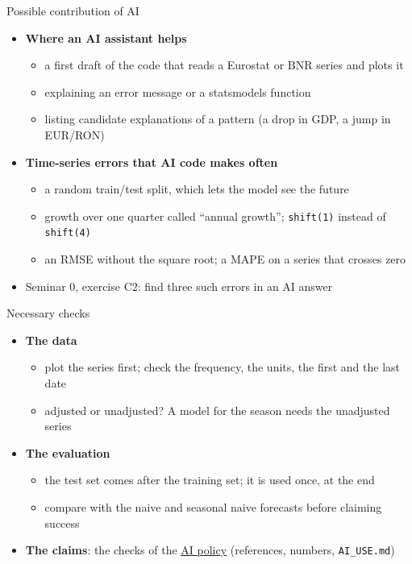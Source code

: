 \begin{frame}{Possible contribution of AI}
\itemsize{\small}
\begin{itemize}
    \item \textbf{Where an AI assistant helps}
    \begin{itemize}
        \item a first draft of the code that reads a Eurostat or BNR series and plots it
        \item explaining an error message or a statsmodels function
        \item listing candidate explanations of a pattern (a drop in GDP, a jump in EUR/RON)
    \end{itemize}
    \item \textbf{Time-series errors that AI code makes often}
    \begin{itemize}
        \item a random train/test split, which lets the model see the future
        \item growth over one quarter called ``annual growth''; \texttt{shift(1)} instead of \texttt{shift(4)}
        \item an RMSE without the square root; a MAPE on a series that crosses zero
    \end{itemize}
    \item Seminar 0, exercise C2: find three such errors in an AI answer
\end{itemize}
\end{frame}

\begin{frame}{Necessary checks}
\itemsize{\small}
\begin{itemize}
    \item \textbf{The data}
    \begin{itemize}
        \item plot the series first; check the frequency, the units, the first and the last date
        \item adjusted or unadjusted? A model for the season needs the unadjusted series
    \end{itemize}
    \item \textbf{The evaluation}
    \begin{itemize}
        \item the test set comes after the training set; it is used once, at the end
        \item compare with the naive and seasonal naive forecasts before claiming success
    \end{itemize}
    \item \textbf{The claims}: the checks of the \hyperlink{ch0-ai-policy}{AI policy} (references, numbers, \texttt{AI\_USE.md})
\end{itemize}
\end{frame}


